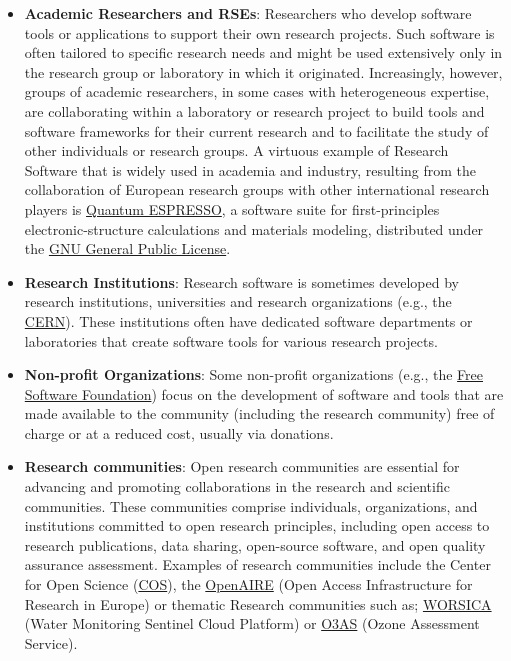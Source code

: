 \begin{itemize}
    \item \textbf{Academic Researchers and RSEs}: Researchers who develop software tools or applications to support their own research projects. Such software is often tailored to specific research needs and might be used extensively only in the research group or laboratory in which it originated. Increasingly, however, groups of academic researchers, in some cases with heterogeneous expertise, are collaborating within a laboratory or research project to build tools and software frameworks for their current research and to facilitate the study of other individuals or research groups. A virtuous example of Research Software that is widely used in academia and industry, resulting from the collaboration of European research groups with other international research players is \href{https://foundation.quantum-espresso.org/}{Quantum ESPRESSO}, a software suite for first-principles electronic-structure calculations and materials modeling, distributed under the \href{https://www.gnu.org/licenses/}{GNU General Public License}.

    \item \textbf{Research Institutions}: Research software is sometimes developed by research institutions, universities and research organizations (e.g., the \href{https://home.web.cern.ch/}{CERN}). These institutions often have dedicated software departments or laboratories that create software tools for various research projects.

    \item \textbf{Non-profit Organizations}: Some non-profit organizations (e.g., the \href{https://www.fsf.org/}{Free Software Foundation}) focus on the development of software and tools that are made available to the community (including the research community) free of charge or at a reduced cost, usually via donations.

    \item \textbf{Research communities}: Open research communities are essential for advancing and promoting collaborations in the research and scientific communities. These communities comprise individuals, organizations, and institutions committed to open research principles, including open access to research publications, data sharing, open-source software, and open quality assurance assessment. Examples of research communities include the Center for Open Science (\href{https://www.cos.io/}{COS}), the \href{https://www.openaire.eu/}{OpenAIRE} (Open Access Infrastructure for Research in Europe) or thematic Research communities such as; \href{https://worsica.incd.pt/}{WORSICA} (Water Monitoring Sentinel Cloud Platform) or \href{https://o3as.data.kit.edu/}{O3AS} (Ozone Assessment Service).
\end{itemize}


